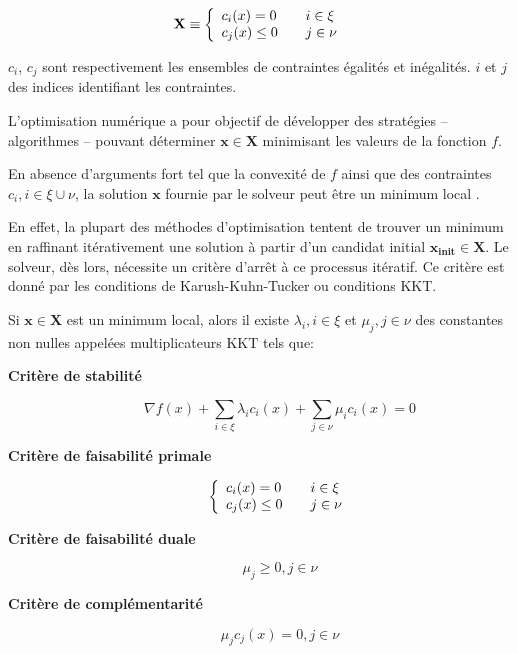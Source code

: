 \begin{equation}
  \mathbf{X} \equiv \left\{
  \begin{array}{l l}
    c_i (x) = 0    & \quad i \in \xi \\
    c_j (x) \leq 0 & \quad j \in \nu \\
  \end{array} \right.
\end{equation}

$c_i$, $c_j$ sont respectivement les ensembles de contraintes égalités
et inégalités. $i$ et $j$ des indices identifiant les contraintes.


L'optimisation numérique a pour objectif de développer des stratégies
-- algorithmes -- pouvant déterminer $\mathbf{x} \in \mathbf{X}$
minimisant les valeurs de la fonction $f$.


En absence d'arguments fort tel que la convexité de $f$ ainsi que des
contraintes $c_i, i \in \xi \cup \nu$, la solution $\mathbf{x}$
fournie par le solveur peut être un minimum local .


En effet, la plupart des méthodes d'optimisation tentent de trouver un
minimum en raffinant itérativement une solution à partir d'un candidat
initial $\mathbf{x_{\text{init}}} \in \mathbf{X}$. Le solveur, dès
lors, nécessite un critère d'arrêt à ce processus itératif. Ce critère
est donné par les conditions de Karush-Kuhn-Tucker  ou conditions KKT.

\begin{mydef}\label{def:chap1_kkt}
Si $\mathbf{x} \in \mathbf{X}$ est un minimum local, alors il existe
$\lambda_i, i \in \xi$ et $\mu_j, j \in \nu$ des constantes non nulles
appelées multiplicateurs KKT tels que:
%
\begin{description}
\item[\textbf{Critère de stabilité}] \begin{equation}
  \nabla f(x) + \sum_{i \in \xi} \lambda_i c_i(x) + \sum_{j \in \nu} \mu_i c_i(x) = 0
\end{equation}
\item[\textbf{Critère de faisabilité primale}] \begin{equation}
\left\{
\begin{array}{l l}
  c_i (x) = 0    & \quad i \in \xi \\
  c_j (x) \leq 0 & \quad j \in \nu \\
\end{array} \right.
\end{equation}
\item[\textbf{Critère de faisabilité duale}] \begin{equation}
\mu_j \geq 0, j \in \nu
\end{equation}
\item[\textbf{Critère de complémentarité}] \begin{equation}
\mu_j c_j(x) = 0, j \in \nu
\end{equation}
\end{description}
\end{mydef}

